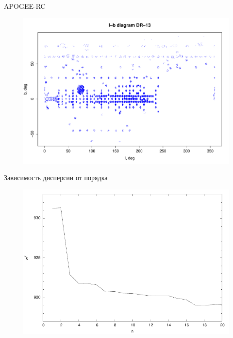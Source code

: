 \documentclass{beamer}
\begin{document}
\begin{frame}{APOGEE-RC}
	\begin{center}
	\begin{figure}[h]
\begin{minipage}[h]{0.8\linewidth}
\includegraphics[width=1\linewidth]{pdf/lb_dr13.pdf}
\end{minipage}
\end{figure}
	\end{center}
\end{frame}
\begin{frame}{Зависимость дисперсии от порядка}
\begin{figure}[h]
\begin{minipage}[h]{0.8\linewidth}
	\includegraphics[width=1\linewidth]{pdf/sigmas.pdf}
\end{minipage}
\end{figure}
\end{frame}
\end{document}
